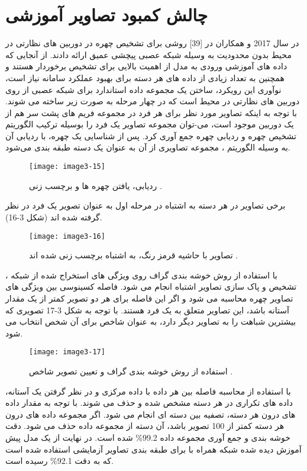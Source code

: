 \section{چالش کمبود تصاویر آموزشی}
در سال 2017  و همکاران در [39] روشی برای تشخیص چهره در دوربین های نظارتی در محیط بدون محدودیت به وسیله شبكه عصبی پیچشی عمیق ارائه دادند. از آنجایی که داده های آموزشی ورودی به مدل از اهمیت بالایی برای تشخیص برخوردار هستند و همچنین به تعداد زیادی از داده های هر دسته برای بهبود عملكرد سامانه نیاز است، نوآوری  این رویکرد، ساختن یک مجموعه داده استاندارد برای شبكه عصبی از روی دوربین های نظارتی در محیط است که در چهار مرحله به صورت زیر ساخته می شوند.
\noindent
با توجه به اینكه تصاویر مورد نظر برای هر فرد در مجموعه فریم های پشت سر هم از یک دوربین موجود است، می-توان مجموعه تصاویر یک فرد را بوسیله ترکیب الگوریتم تشخیص چهره و ردیابی چهره جمع آوری کرد. پس از شناسایی یک چهره، با ردیابی آن به وسیله الگوریتم ، مجموعه تصاویری از آن به عنوان یک دسته طبقه بندی می‌شود.
\begin{figure}[h]
\centering
  \texttt{[image: image3-15]}
  \caption{ردیابی، یافتن چهره ها و برچسب زنی \cite{ref1}.}
  \label{image2-1}
\end{figure}
\noindent
	برخی تصاویر در هر دسته به اشتباه در مرحله اول به عنوان تصویر یک فرد در نظر گرفته شده اند (شکل 3-16).
\begin{figure}[h]
\centering
  \texttt{[image: image3-16]}
  \caption{تصاویر با حاشیه قرمز رنگ، به اشتباه برچسب زنی شده اند \cite{ref1}.}
  \label{image2-1}
\end{figure}
\noindent
با استفاده از روش خوشه بندی گراف  روی ویژگی های استخراج شده از شبكه ، تشخیص و پاک سازی تصاویر اشتباه انجام می شود. فاصله کسینوسی بین ویژگی های تصاویر چهره محاسبه می شود و اگر این فاصله برای هر دو تصویر کمتر از یک مقدار آستانه باشد، این تصاویر متعلق به یک فرد هستند. با توجه به شکل 3-17 تصویری که بیشترین شباهت را به تصاویر دیگر دارد، به عنوان شاخص برای آن شخص انتخاب می شود.
\begin{figure}[h]
\centering
  \texttt{[image: image3-17]}
  \caption{ استفاده از روش خوشه بندی گراف و تعیین تصویر شاخص \cite{ref1}.}
  \label{image2-1}
\end{figure}
\noindent
	با استفاده از محاسبه فاصله بین هر داده با داده مرکزی و در نظر گرفتن یک آستانه، داده های تكراری در هر دسته مشخص شده و حذف  می شوند.
	با توجه به مقدار داده های درون هر دسته، تصفیه بین دسته ای انجام می شود. اگر مجموعه داده های درون هر دسته کمتر از 100 تصویر باشد، آن دسته از مجموعه داده حذف می شود.
دقت خوشه بندی و جمع آوری مجموعه داده 99.2\% شده است. در نهایت از یک مدل پیش آموزش دیده شده شبكه  همراه با  برای طبقه بندی تصاویر آزمایشی استفاده شده است که به دقت 92.1\% رسیده است.

